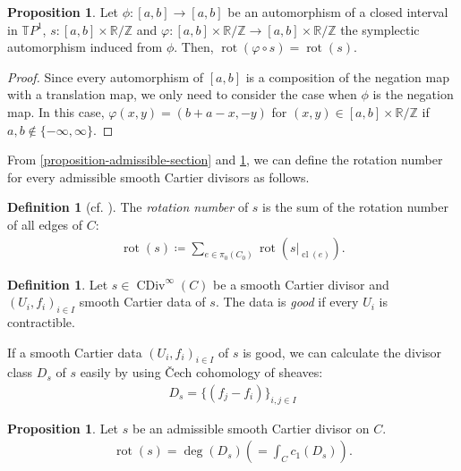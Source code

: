 \documentclass[a4paper,dvipdfmx,reqno,12pt]{amsart}
\theoremstyle{definition}
\newtheorem{definition}[theorem]{Definition}
\newtheorem{proposition}[theorem]{Proposition}
\newcommand{\deq}{\coloneqq}
\newcommand{\opn}[1]{\operatorname{#1}}
\numberwithin{equation}{section}
\begin{document}
\begin{proposition} \label{proposition-rotation-number}
Let 
$\phi \colon [a,b] \to [a,b]$ be an automorphism of 
a closed interval in $\mathbb{T}P^{1}$, 
$s\colon [a,b]\times \mathbb{R}/\mathbb{Z}$ and 
$\varphi \colon [a,b]\times \mathbb{R}/\mathbb{Z} \to 
[a,b]\times \mathbb{R}/\mathbb{Z}$ 
the symplectic automorphism induced from $\phi$.
Then, $\opn{rot}(\varphi\circ s)=\opn{rot}(s)$.
\end{proposition}
\begin{proof}
Since every automorphism of 
$[a,b]$ is a composition of the negation map 
with a translation map, we only need to consider the case
when $\phi$ is the negation map.
In this case, $\varphi(x,y)=(b+a-x,-y)$ for 
$(x,y)\in [a,b]\times \mathbb{R}/\mathbb{Z}$ if 
$a,b\notin \{-\infty,\infty\}$.
\end{proof}


From \cref{proposition-admissible-section} and \cref{proposition-rotation-number}, we can define the 
rotation number for every admissible smooth 
Cartier divisors as follows.
\begin{definition}[{cf. \cite{auroux2022lagrangian}}]
The \emph{rotation number} of $s$ is the sum of
the rotation number of all edges of $C$: 
\begin{align}
\opn{rot}(s)\deq \sum_{e\in \pi_0(C_0)}
\opn{rot}(s|_{\opn{cl}(e)}).
\end{align}

\end{definition}

\begin{definition}
Let $s\in \opn{CDiv}^{\infty}(C)$ be a smooth Cartier
divisor and $(U_i,f_i)_{i\in I}$ smooth Cartier data
of $s$. The data is \emph{good} if 
every $U_i$ is contractible.
\end{definition}
If a smooth Cartier data $(U_i,f_i)_{i\in I}$ of $s$ 
is good,
we can calculate the divisor class $D_s$ of $s$ easily
by using \v{C}ech cohomology of sheaves:
\begin{align}
D_s=\{(f_j-f_i)\}_{i,j\in I}
\end{align}

\begin{proposition}
Let $s$ be an admissible smooth Cartier divisor on $C$.
\label{equation-rotation-number}
\begin{align}
\opn{rot}(s)=\opn{deg}(D_s)(=\int_{C} c_1(D_s)).
\end{align}
\end{proposition}
\end{document}
